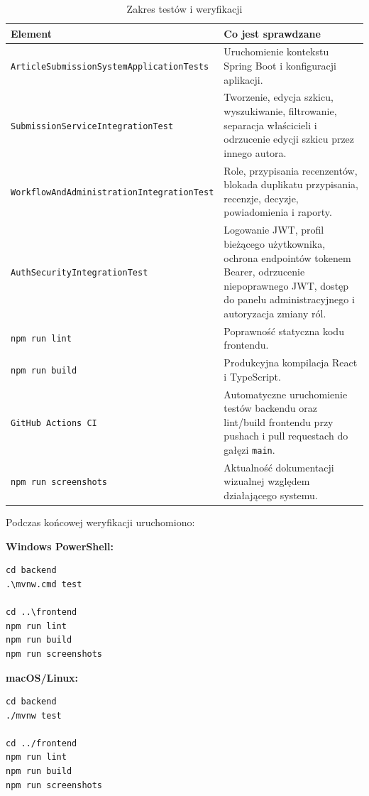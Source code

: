 \documentclass[times]{san}
\begin{document}
\begin{table}[!htbp]
\centering
\caption{Zakres testów i weryfikacji}
\label{tab:tests}
\begin{tabular}{|p{}|p{}|}
\hline
Element & Co jest sprawdzane \\
\hline
\texttt{ArticleSubmissionSystemApplicationTests} & Uruchomienie kontekstu Spring Boot i konfiguracji aplikacji. \\
\hline
\texttt{SubmissionServiceIntegrationTest} & Tworzenie, edycja szkicu, wyszukiwanie, filtrowanie, separacja właścicieli i odrzucenie edycji szkicu przez innego autora. \\
\hline
\texttt{WorkflowAndAdministrationIntegrationTest} & Role, przypisania recenzentów, blokada duplikatu przypisania, recenzje, decyzje, powiadomienia i raporty. \\
\hline
\texttt{AuthSecurityIntegrationTest} & Logowanie JWT, profil bieżącego użytkownika, ochrona endpointów tokenem Bearer, odrzucenie niepoprawnego JWT, dostęp do panelu administracyjnego i autoryzacja zmiany ról. \\
\hline
\texttt{npm run lint} & Poprawność statyczna kodu frontendu. \\
\hline
\texttt{npm run build} & Produkcyjna kompilacja React i TypeScript. \\
\hline
\texttt{GitHub Actions CI} & Automatyczne uruchomienie testów backendu oraz lint/build frontendu przy pushach i pull requestach do gałęzi \texttt{main}. \\
\hline
\texttt{npm run screenshots} & Aktualność dokumentacji wizualnej względem działającego systemu. \\
\hline
\end{tabular}
\end{table}

Podczas końcowej weryfikacji uruchomiono:

\textbf{Windows PowerShell:}

\begin{verbatim}
cd backend
.\mvnw.cmd test

cd ..\frontend
npm run lint
npm run build
npm run screenshots
\end{verbatim}

\textbf{macOS/Linux:}

\begin{verbatim}
cd backend
./mvnw test

cd ../frontend
npm run lint
npm run build
npm run screenshots
\end{verbatim}
\end{document}
